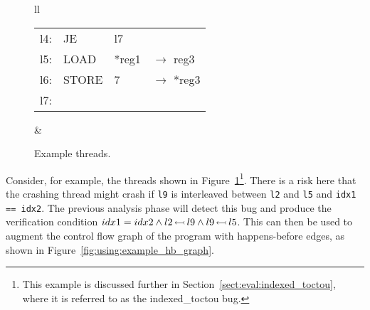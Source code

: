 \begin{figure}
\begin{tabular}{ll}
{{\begin{tabular}{rlll}
          l4: & JE & l7 \\
          l5: & LOAD & *reg1 & \!\!\!$\rightarrow$ reg3 \\
          l6: & STORE & 7 & \!\!\!$\rightarrow$ *reg3 \\
          l7:
        \end{tabular}
      }
    } & \hspace{-5mm}%
    \\
  \end{tabular}
  \caption{Example threads.}
  \label{fig:enforce:example_threads}
\end{figure}
  
Consider, for example, the threads shown in
Figure~\ref{fig:enforce:example_threads}\footnote{This example is
  discussed further in Section~\ref{sect:eval:indexed_toctou}, where
  it is referred to as the indexed\_toctou bug.}.  There is a risk
here that the crashing thread might crash if \verb|l9| is interleaved
between \verb|l2| and \verb|l5| and \verb|idx1 == idx2|.  The previous
analysis phase will detect this bug and produce the verification
condition $idx1 = idx2 \wedge l2\,{\leftarrowtail}\,l9 \wedge
l9\,{\leftarrowtail}\,l5$.  This can then be used to augment the control
flow graph of the program with happens-before edges, as shown in
Figure~\ref{fig:using:example_hb_graph}.


